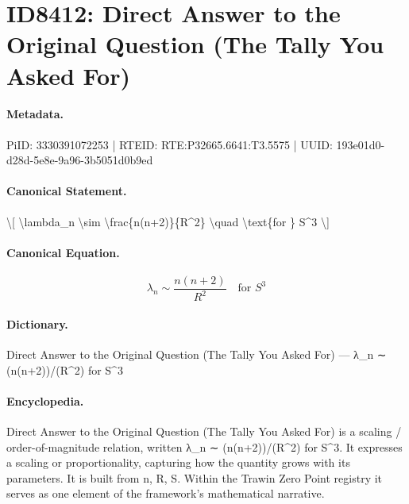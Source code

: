 \section*{ID8412: Direct Answer to the Original Question (The Tally You Asked For)}
\paragraph{Metadata.}
PiID: 3330391072253 | RTEID: RTE:P32665.6641:T3.5575 | UUID: 193e01d0-d28d-5e8e-9a96-3b5051d0b9ed

\paragraph{Canonical Statement.}
\textbackslash{}[ \textbackslash{}lambda\_n \textbackslash{}sim \textbackslash{}frac\{n(n+2)\}\{R\textasciicircum{}2\} \textbackslash{}quad \textbackslash{}text\{for \} S\textasciicircum{}3 \textbackslash{}]

\paragraph{Canonical Equation.}
\[
\lambda_n \sim \frac{n(n+2)}{R^2} \quad \text{for } S^3
\]

\paragraph{Dictionary.}
Direct Answer to the Original Question (The Tally You Asked For) — λ\_n ∼ (n(n+2))/(R\textasciicircum{}2) for S\textasciicircum{}3

\paragraph{Encyclopedia.}
Direct Answer to the Original Question (The Tally You Asked For) is a scaling / order-of-magnitude relation, written λ\_n ∼ (n(n+2))/(R\textasciicircum{}2) for S\textasciicircum{}3. It expresses a scaling or proportionality, capturing how the quantity grows with its parameters. It is built from n, R, S. Within the Trawin Zero Point registry it serves as one element of the framework's mathematical narrative.
